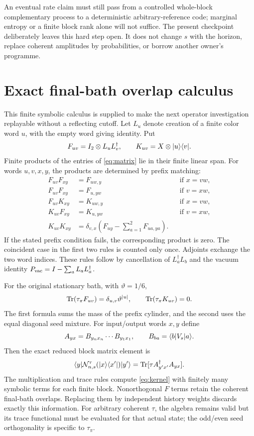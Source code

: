 An eventual rate claim must still pass from a controlled whole-block complementary process to a deterministic arbitrary-reference code; marginal entropy or a finite block rank alone will not suffice. The present checkpoint deliberately leaves this hard step open. It does not change $s$ with the horizon, replace coherent amplitudes by probabilities, or borrow another owner's programme.

\section{Exact final-bath overlap calculus}\label{app:overlap}

This finite symbolic calculus is supplied to make the next operator investigation replayable without a reflecting cutoff. Let $L_u$ denote creation of a finite color word $u$, with the empty word giving identity. Put
\[
 F_{uv}=I_2\otimes L_uL_v^\dagger,\qquad
 K_{uv}=X\otimes\lvert u\rangle\langle v\rvert.
\]
Finite products of the entries of \eqref{eq:matrix} lie in their finite linear span. For words $u,v,x,y$, the products are determined by prefix matching:
\begin{align*}
 F_{uv}F_{xy}&=F_{uw,y}&&\text{if }x=vw,\\
 F_{uv}F_{xy}&=F_{u,yw}&&\text{if }v=xw,\\
 F_{uv}K_{xy}&=K_{uw,y}&&\text{if }x=vw,\\
 K_{uv}F_{xy}&=K_{u,yw}&&\text{if }v=xw,\\
 K_{uv}K_{xy}&=\delta_{v,x}\left(F_{uy}-\sum_{a=1}^2F_{ua,ya}\right).
\end{align*}
If the stated prefix condition fails, the corresponding product is zero. The coincident case in the first two rules is counted only once. Adjoints exchange the two word indices. These rules follow by cancellation of $L_a^\dagger L_b$ and the vacuum identity $P_{\rm vac}=I-\sum_aL_aL_a^\dagger$.

For the original stationary bath, with $\vartheta=1/6$,
\[
 \operatorname{Tr}(\tau_\pi F_{uv})=\delta_{u,v}\vartheta^{|u|},\qquad
 \operatorname{Tr}(\tau_\pi K_{uv})=0.
\]
The first formula sums the mass of the prefix cylinder, and the second uses the equal diagonal seed mixture. For input/output words $x,y$ define
\[
 A_{yx}=B_{y_nx_n}\cdots B_{y_1x_1},\qquad B_{ba}=\langle b\rvert V_s\lvert a\rangle.
\]
Then the exact reduced block matrix element is
\begin{equation}
 \langle y\rvert\mathcal N_{n,s}^\tau(\lvert x\rangle\langle x'\rvert)\lvert y'\rangle
 =\operatorname{Tr}[\tau A_{y'x'}^\dagger A_{yx}].\label{eq:kernel}
\end{equation}
The multiplication and trace rules compute \eqref{eq:kernel} with finitely many symbolic terms for each finite block. Nonorthogonal $F$ terms retain the coherent final-bath overlaps. Replacing them by independent history weights discards exactly this information. For arbitrary coherent $\tau$, the algebra remains valid but its trace functional must be evaluated for that actual state; the odd/even seed orthogonality is specific to $\tau_\pi$.

